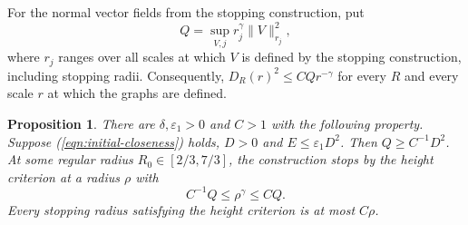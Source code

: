 \documentclass[11pt,a4paper]{article}
\numberwithin{equation}{section}
\newtheorem{proposition}[theorem]{Proposition}
\theoremstyle{definition}
\theoremstyle{remark}
\begin{document}
	For the normal vector fields from the stopping construction, put
	\[
	Q=\sup_{V,j}r_j^{\gamma}\|V\|_{r_j}^2,
	\]
	where $r_j$ ranges over all scales at which $V$ is defined by the
	stopping construction, including stopping radii. Consequently,
	$D_R(r)^2\le CQr^{-\gamma}$
	for every $R$ and every scale $r$ at which the graphs are defined.
	
	\begin{proposition}\label{prop:stopping}
		There are $\delta,\varepsilon_1>0$ and $C>1$ with the following property. Suppose
		(\ref{eqn:initial-closeness}) holds, $D>0$ and $E\le\varepsilon_1 D^2$.
		Then $Q\ge C^{-1}D^2$. At some regular radius $R_0\in[2/3,7/3]$,
		the construction stops by the height criterion at a radius $\rho$ with
		\[
		C^{-1}Q\le\rho^{\gamma}\le CQ.
		\]
		Every stopping radius satisfying the height criterion is at most $C\rho$.
	\end{proposition}
	
\end{document}
